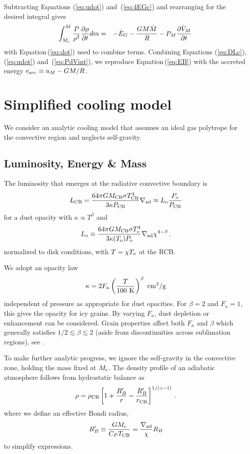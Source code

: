 \documentclass[12pt, preprint,numberedappendix]{emulateapj}
\newcommand{\p}{\partial}
\newcommand{\Eq}[1]{Equation\,(\ref{#1})}
\newcommand{\Eqs}[2]{Equations (\ref{#1}) and~(\ref{#2})}
\newcommand{\Eqsss}[3]{Equations (\ref{#1}), (\ref{#2}) and~(\ref{#3})}
\newcommand{\delad}{\nabla_{\rm ad}}
\newcommand{\co}{_{\rm c}}
\newcommand{\di}{_{\rm o}}
\newcommand{\cb}{_{\rm CB}}
\newcommand{\surf}{_M}
\begin{document}
Subtracting \Eqs{eq:udot}{eq:4EGc} and rearranging for the desired integral gives
\begin{eqnarray}\label{eq:PdVint}
\int_{M\co}^M {P \over \rho^2} {\p \rho \over \p t} dm  &=&  - \dot{E}_G - {G M \dot{M} \over R} - P\surf {\p \dot{V}\surf \over \p t} \,  
\end{eqnarray} 
with \Eq{eq:dot} used to combine terms.  Combining \Eqsss{eq:DLc}{eq:udot}{eq:PdVint}, we reproduce \Eq{eq:EB} with the accreted energy $e_{\rm acc} \equiv u\surf - GM/R$.  



\section{Simplified cooling model}
We consider an analytic cooling model that assumes an ideal gas polytrope for the convective region and neglects self-gravity.  

\subsection{Luminosity,  Energy \& Mass}
The luminosity that emerges at the radiative convective boundary is
\begin{equation} \label{eq:Lcb}
L\cb = {64 \pi G M\cb \sigma T\cb^4 \over 3 \kappa P\cb } \nabla_{\rm ad} \approx L\di {P\di \over P\cb} %
\end{equation} 
for a dust opacity with $\kappa \propto T^\beta$ and
\begin{equation} 
L\di \equiv {64 \pi G M\cb \sigma T\di^4 \over 3 \kappa(T\di) P\di} \nabla_{\rm ad}\chi^{4-\beta}\, .
\end{equation} 
normalized to disk conditions, with $T = \chi T\di$ at the RCB.

We adopt an opacity law
\begin{equation}
\kappa = 2 F_\kappa \left(T \over 100~{\rm K}\right)^\beta ~{\rm cm^2/g}
\end{equation} 
independent of pressure as appropriate for dust opacities.  For $\beta = 2$ and $F_\kappa = 1$, this gives the \citet{bl94} opacity for icy grains.  By varying $F_\kappa$, dust depletion or enhancement can be considered.  Grain properties affect both $F_\kappa$ and $\beta$ which generally satisfies  $1/2 \lesssim \beta \lesssim 2$ (aside from discontinuities across sublimation regions), see \citet{SemHen03}.

To make further analytic progress, we ignore the self-gravity in the convective zone, holding the mass fixed at $M\co$.  The density profile of an adiabatic atmosphere follows from hydrostatic balance as 
\begin{equation}\label{eq:rhoconv} 
\rho = \rho\cb \left[ 1 + {R_B' \over r} - {R_B' \over r\cb}  \right]^{1/(\gamma -1)}\, .
\end{equation} 
where we define an effective Bondi radius,
\begin{equation}
R_B' \equiv {G M\co \over C_P T\cb} = {\delad \over \chi} R_B
\end{equation} 
to simplify expressions.
\end{document}
